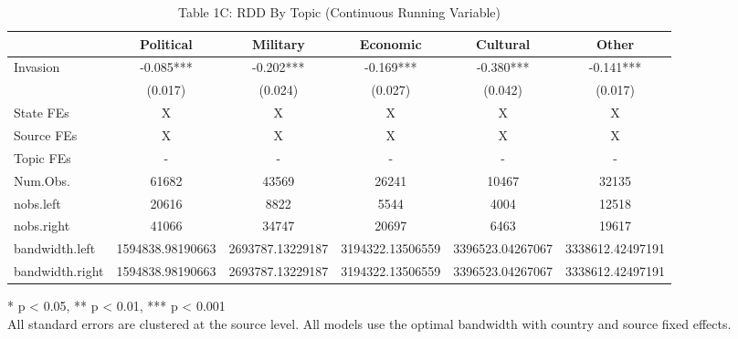 \begin{table}[!t]
\caption{Table 1C: RDD By Topic (Continuous Running Variable)} 
\fontsize{12.0pt}{14.4pt}\selectfont
\begin{tabular*}{\linewidth}{@{\extracolsep{\fill}}lccccc}
\toprule
  & Political & Military & Economic & Cultural & Other \\ 
\midrule\addlinespace[2.5pt]
Invasion & -0.085*** & -0.202*** & -0.169*** & -0.380*** & -0.141*** \\ 
{} & {(0.017)} & {(0.024)} & {(0.027)} & {(0.042)} & {(0.017)} \\ 
State FEs & X & X & X & X & X \\ 
Source FEs & X & X & X & X & X \\ 
Topic FEs & - & - & - & - & - \\ 
Num.Obs. & 61682 & 43569 & 26241 & 10467 & 32135 \\ 
nobs.left & 20616 & 8822 & 5544 & 4004 & 12518 \\ 
nobs.right & 41066 & 34747 & 20697 & 6463 & 19617 \\ 
bandwidth.left & 1594838.98190663 & 2693787.13229187 & 3194322.13506559 & 3396523.04267067 & 3338612.42497191 \\ 
bandwidth.right & 1594838.98190663 & 2693787.13229187 & 3194322.13506559 & 3396523.04267067 & 3338612.42497191 \\ 
\bottomrule
\end{tabular*}
\begin{minipage}{\linewidth}
* p < 0.05, ** p < 0.01, *** p < 0.001\\
All standard errors are clustered at the source level. All models use the
optimal bandwidth with country and source fixed effects.\\
\end{minipage}
\end{table}

